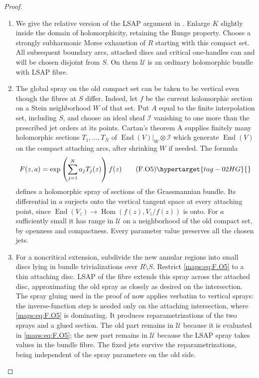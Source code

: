 \begin{proof}
\begin{enumerate}[label={$\langle1\rangle$\arabic*.}]
\item We give the relative version of the LSAP argument
in \cite[Lemma 5.1, Theorem 6.1 and Proposition 7.13(d)]
{IVVOkaOneV5}.    Enlarge $K$ slightly inside
the domain of holomorphicity, retaining the Runge property.
Choose a strongly subharmonic Morse exhaustion of $R$ starting
with this compact set.  All subsequent boundary arcs, attached
discs and critical one-handles can and will be chosen disjoint
from $S$.  On them $\mathscr U$ is an ordinary holomorphic
bundle with LSAP fibre.

\item The global spray on the old compact set can be taken to be
vertical even though the fibres at $S$ differ.  Indeed, let $f$
be the current holomorphic section on a Stein neighborhood $W$
of that set.  Put $A$ equal to the finite interpolation set,
including $S$, and choose an ideal sheaf $\mathcal I$ vanishing
to one more than the prescribed jet orders at its points.
Cartan's theorem A supplies finitely many holomorphic sections
$T_1,\ldots,T_N$ of
$\operatorname{End}(V)|_W\otimes\mathcal I$ which generate
$\operatorname{End}(V)$ on the compact attaching arcs, after
shrinking $W$ if needed.  The formula
\[
 F(z,a)=\exp\left(\sum_{j=1}^N a_jT_j(z)\right)f(z)
 \tag{F.O5}\hypertarget{tag-02HG}{}\label{maps:eq:F.O5}
\]
defines a holomorphic spray of sections of the Grassmannian
bundle.  Its differential in $a$ surjects onto the vertical
tangent space at every attaching point, since
$\operatorname{End}(V_z)\to
\operatorname{Hom}(f(z),V_z/f(z))$ is onto.
For $a$ sufficiently small it has range in $\mathscr U$ on
a neighborhood of the old compact set, by openness and
compactness.  Every parameter value preserves all the chosen
jets.  

\item For a noncritical extension, subdivide the new annular regions
into small discs lying in bundle trivializations over
$R\setminus S$.  Restrict \eqref{maps:eq:F.O5} to a thin attaching disc.
LSAP of the fibre extends this spray across the attached disc,
approximating the old spray as closely as desired on the
intersection.  The spray gluing used in the proof of
\cite[Lemma 5.1, equations (5.6)--(5.8)]
{IVVOkaOneV5} now applies verbatim to vertical sprays:
the inverse-function step is needed only on the attaching
intersection, where \eqref{maps:eq:F.O5} is dominating.  It produces
reparametrizations of the two sprays and a glued section.
The old part remains in $\mathscr U$ because it is evaluated
in \eqref{maps:eq:F.O5}; the new part remains in $\mathscr U$ because the
LSAP spray takes values in the bundle fibre.  The fixed jets
survive the reparametrizations, being independent of the
spray parameters on the old side.


\end{enumerate}
\end{proof}
